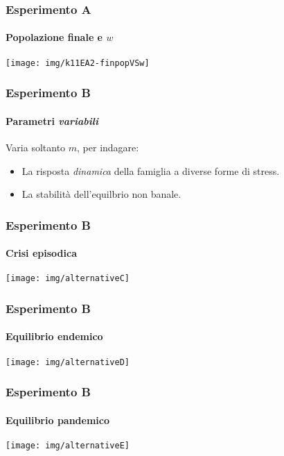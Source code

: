 \documentclass[]{beamer}
\begin{document}
\begin{frame}
    \frametitle{Esperimento A}
    \framesubtitle{Popolazione finale e $w$}

    \begin{center}
        \texttt{[image: img/k11EA2-finpopVSw]}
    \end{center}
\end{frame}

\begin{frame}
    \frametitle{Esperimento B}
    \framesubtitle{Parametri \emph{variabili}}

    Varia soltanto $m$, per indagare:
    \begin{itemize}
        \item La risposta \emph{dinamica} della famiglia a diverse forme di stress.
        \item \pause La stabilità dell'equilbrio non banale.
    \end{itemize}
\end{frame}

\begin{frame}
    \frametitle{Esperimento B}
    \framesubtitle{Crisi episodica}

    \begin{center}
        \texttt{[image: img/alternativeC]}
    \end{center}
\end{frame}

\begin{frame}
    \frametitle{Esperimento B}
    \framesubtitle{Equilibrio endemico}

    \begin{center}
        \texttt{[image: img/alternativeD]}
    \end{center}
\end{frame}

\begin{frame}
    \frametitle{Esperimento B}
    \framesubtitle{Equilibrio pandemico}

    \begin{center}
        \texttt{[image: img/alternativeE]}
    \end{center}
\end{frame}
\end{document}

